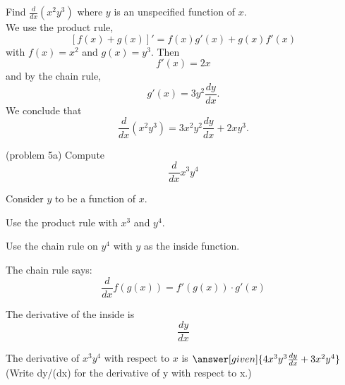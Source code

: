 \documentclass{ximera}
\begin{document}
\begin{example}[example 5]
Find $\frac{d}{dx} (x^2y^3)$ where $y$ is an unspecified function of $x$.\\
We use the product rule,
\[\displaystyle{[f(x) + g(x)]' = f(x)g'(x) + g(x)f'(x)}\]
with $f(x) = x^2$ and $g(x) = y^3$. Then 
\[f'(x) = 2x \]
and by the chain rule,
\[g'(x) = 3y^2\frac{dy}{dx}.\]
We conclude that
\[\frac{d}{dx} (x^2y^3) = 3x^2y^2\frac{dy}{dx} + 2xy^3.\]
\end{example}



\begin{center}
\begin{foldable}
\end{foldable}
\end{center}

\begin{problem}(problem 5a)
  Compute
  \[
  \frac{d}{dx} x^3y^4
  \]
  
	  
    \begin{hint}
      Consider $y$ to be a function of $x$.
    \end{hint}
		\begin{hint}
      Use the product rule with $x^3$ and $y^4$.
    \end{hint}
    \begin{hint}
      Use the chain rule on $y^4$ with $y$ as the inside function.
    \end{hint}
    \begin{hint}
      The chain rule says:
      \[
      \frac{d}{dx} f(g(x)) = f'(g(x))\cdot g'(x)
      \]
    \end{hint}
    \begin{hint}
      The derivative of the inside is 
      \[
      \frac{dy}{dx}
      \]
    \end{hint}
    
		The derivative of $x^3 y^4$ with respect to $x$ is
		 $\answer[given]{4x^3 y^3 \frac{dy}{dx} + 3x^2y^4}$  (Write dy/(dx) for the derivative of y with respect to x.)
		
\end{problem}
\end{document}

